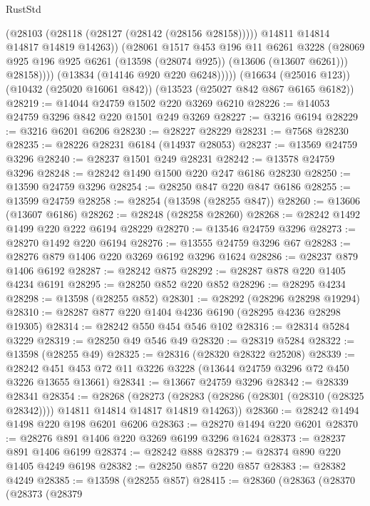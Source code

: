 \begin{lexlean}{RustStd}
\begin{coremodule}
                    (@28103 (@28118 (@28127 (@28142 (@28156 @28158)))))
                    @14811
                    @14814
                    @14817
                    @14819
                    @14263))
                (@28061
                  @1517
                  @453
                  @196
                  @11
                  @6261
                  @3228
                  (@28069 @925 @196 @925 @6261 (@13598 (@28074 @925)) (@13606 (@13607 @6261)))
                  @28158))))
          (@13834 (@14146 @920 @220 @6248)))))
    (@16634 (@25016 @123))
    (@10432 (@25020 @16061 @842))
    (@13523 (@25027 @842 @867 @6165 @6182))
@28219 := @14044 @24759 @1502 @220 @3269 @6210
@28226 := @14053 @24759 @3296 @842 @220 @1501 @249 @3269
@28227 := @3216 @6194
@28229 := @3216 @6201 @6206
@28230 := @28227 @28229
@28231 := @7568 @28230
@28235 := @28226 @28231 @6184 (@14937 @28053)
@28237 := @13569 @24759 @3296
@28240 := @28237 @1501 @249 @28231
@28242 := @13578 @24759 @3296
@28248 := @28242 @1490 @1500 @220 @247 @6186 @28230
@28250 := @13590 @24759 @3296
@28254 := @28250 @847 @220 @847 @6186
@28255 := @13599 @24759
@28258 := @28254 (@13598 (@28255 @847))
@28260 := @13606 (@13607 @6186)
@28262 := @28248 (@28258 @28260)
@28268 := @28242 @1492 @1499 @220 @222 @6194 @28229
@28270 := @13546 @24759 @3296
@28273 := @28270 @1492 @220 @6194
@28276 := @13555 @24759 @3296 @67
@28283 := @28276 @879 @1406 @220 @3269 @6192 @3296 @1624
@28286 := @28237 @879 @1406 @6192
@28287 := @28242 @875
@28292 := @28287 @878 @220 @1405 @4234 @6191
@28295 := @28250 @852 @220 @852
@28296 := @28295 @4234
@28298 := @13598 (@28255 @852)
@28301 := @28292 (@28296 @28298 @19294)
@28310 := @28287 @877 @220 @1404 @4236 @6190 (@28295 @4236 @28298 @19305)
@28314 := @28242 @550 @454 @546 @102
@28316 := @28314 @5284 @3229
@28319 := @28250 @49 @546 @49
@28320 := @28319 @5284
@28322 := @13598 (@28255 @49)
@28325 := @28316 (@28320 @28322 @25208)
@28339 := @28242 @451 @453 @72 @11 @3226 @3228 (@13644 @24759 @3296 @72 @450 @3226 @13655 @13661)
@28341 := @13667 @24759 @3296
@28342 := @28339 @28341
@28354 := @28268
    (@28273 (@28283 (@28286 (@28301 (@28310 (@28325 @28342)))) @14811 @14814 @14817 @14819 @14263))
@28360 := @28242 @1494 @1498 @220 @198 @6201 @6206
@28363 := @28270 @1494 @220 @6201
@28370 := @28276 @891 @1406 @220 @3269 @6199 @3296 @1624
@28373 := @28237 @891 @1406 @6199
@28374 := @28242 @888
@28379 := @28374 @890 @220 @1405 @4249 @6198
@28382 := @28250 @857 @220 @857
@28383 := @28382 @4249
@28385 := @13598 (@28255 @857)
@28415 := @28360
    (@28363
      (@28370
        (@28373
          (@28379

\end{coremodule}
\end{lexlean}
